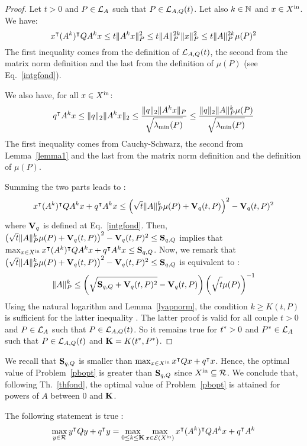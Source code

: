 \documentclass[10pt]{article}
\begin{document}
\begin{proof}
Let $t>0$ and $P\in\mathcal{L}_{A}$ such that $P\in\mathcal{L}_{A,Q}(t)$. Let also $k\in\mathbb{N}$ and $x\in X^\mathrm{in}$. We have:
\[
x^\intercal (A^k)^\intercal Q A^k x  
\leq  t \| A^k x\|_P^2\leq t\| A\|^{2k}_P \| x\|^2_P
\leq t\| A\|_P^{2k} \mu(P)^2
\]
The first inequality comes from the definition of $\mathcal{L}_{A,Q}(t)$, the second from the matrix norm definition and the last from the definition of $\mu(P)$ (see Eq.~\eqref{intgfond}).

We also have, for all $x\in X^\mathrm{in}$:
\[
q^\intercal A^k x
\leq \| q\|_2 \| A^k x\|_2\leq \dfrac{\| q\|_2 \| A^k x\|_P}{\sqrt{\strut \lambda_{\operatorname{min}}(P)}} 
\leq \dfrac{\| q\|_2\| A\|_P^{k} \mu(P)}{\sqrt{\strut \lambda_{\operatorname{min}}(P)}}
\]
The first inequality comes from Cauchy-Schwarz, the second from Lemma~\ref{lemma1} and the last from the matrix norm definition and the definition of $\mu(P)$. 

Summing the two parts leads to :
\[
x^\intercal (A^k)^\intercal Q A^k x+q^\intercal A^k x\leq \left(\sqrt{t}\| A\|_P^k\mu(P)+\mathbf{V}_{q}(t,P)\right)^2-\mathbf{V}_{q}(t,P)^2
\]
where $\mathbf{V}_{q}$ is defined at Eq.~\eqref{intgfond}. Then, $ \left(\sqrt{t}\| A\|_P^k\mu(P)+\mathbf{V}_{q}(t,P)\right)^2-\mathbf{V}_{q}(t,P)^2\leq \mathbf{S}_{q,Q}$ implies that $ \max_{x\in X^\mathrm{in}} x^\intercal (A^k)^\intercal Q A^k x+q^\intercal A^k x\leq \mathbf{S}_{q,Q}$. Now, we remark that  $\left(\sqrt{t}\| A\|_P^k\mu(P)+\mathbf{V}_{q}(t,P)\right)^2-\mathbf{V}_{q}(t,P)^2\leq \mathbf{S}_{q,Q}$ is equivalent to :
\[
\| A\|_P^k\leq \left(\sqrt{\strut \mathbf{S}_{q,Q}+\mathbf{V}_{q}(t,P)^2}-\mathbf{V}_{q}(t,P)\right)\left(\sqrt{\strut t}\mu(P)\right)^{-1}
\]
Using the natural logarithm and Lemma~\ref{lyapnorm}, the condition  $k\geq K(t,P)$ is sufficient for the latter inequality .  The latter proof is valid for all couple $t>0$ and $P\in\mathcal{L}_{A}$ such that $P\in\mathcal{L}_{A,Q}(t)$. So it remains true for   $t^*>0$ and $P^*\in\mathcal{L}_{A}$ such that $P\in\mathcal{L}_{A,Q}(t)$ and $\mathbf{K}=K(t^*,P^*)$. 
\end{proof}
We recall that $\mathbf{S}_{q,Q}$ is smaller than $\max_{x\in X^\mathrm{in}} x^\intercal Q x+q^\intercal x$. Hence, the optimal value of Problem~\ref{pbopt} is greater than $\mathbf{S}_{q,Q}$ since $X^\mathrm{in}\subseteq \mathcal{R}$. We conclude that, following Th.~\ref{thfond}, the optimal value of Problem~\ref{pbopt} is attained for powers of $A$ between 0 and $\mathbf{K}$.

\begin{corollary}
The following statement is true :
 \[
\max_{y\in\mathcal{R}} y^\intercal Q y+q^\intercal y=\max_{0\leq k\leq \mathbf{K}} \max_{x\in \mathcal{E}(X^\mathrm{in})} x^\intercal (A^k)^\intercal Q A^k x+q^\intercal A^k
\]
\end{corollary}
\end{document}
